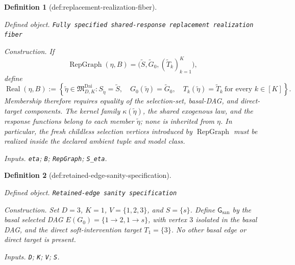 \documentclass{article}
\newtheorem{definition}{Definition}
\begin{document}
\begin{definition}[def:replacement-realization-fiber]\label{def:replacement-realization-fiber}
\par\smallskip\noindent\emph{Defined object.} \texttt{Fully specified shared-\allowbreak{}response replacement realization fiber}
\par\smallskip\noindent\emph{Construction.} If
\[
 \operatorname{RepGraph}(\eta,B)
 =\bigl(\widetilde S,\widetilde G_0,(\widetilde T_k)_{k=1}^{K}\bigr),
\]
define
\[
 \operatorname{Real}(\eta,B)
 :=\left\{\widetilde\eta\in\mathfrak M_{D,K}^{\mathrm{Dai}}:
 S_{\widetilde\eta}=\widetilde S,\quad
 G_0(\widetilde\eta)=\widetilde G_0,\quad
 T_k(\widetilde\eta)=\widetilde T_k\ \text{for every }k\in[K]
 \right\}.
\]
Membership therefore requires equality of the selection-set, basal-DAG, and direct-target components. The kernel family \(\kappa(\widetilde\eta)\), the shared exogenous law, and the response functions belong to each member \(\widetilde\eta\); none is inherited from \(\eta\). In particular, the fresh childless selection vertices introduced by \(\operatorname{RepGraph}\) must be realized inside the declared ambient tuple and model class.
\par\smallskip\noindent\emph{Inputs.} \texttt{eta}; \texttt{B}; \texttt{RepGraph}; \texttt{S\_\allowbreak{}eta}.
\end{definition}

\begin{definition}[def:retained-edge-sanity-specification]\label{def:retained-edge-sanity-specification}
\par\smallskip\noindent\emph{Defined object.} \texttt{Retained-\allowbreak{}edge sanity specification}
\par\smallskip\noindent\emph{Construction.} Set \(D=3\), \(K=1\), \(V=\{1,2,3\}\), and \(S=\{s\}\). Define \(\mathsf G_{\mathrm{san}}\) by the basal selected DAG \(E(G_0)=\{1\to2,1\to s\}\), with vertex \(3\) isolated in the basal DAG, and the direct soft-intervention target \(T_1=\{3\}\). No other basal edge or direct target is present.
\par\smallskip\noindent\emph{Inputs.} \texttt{D}; \texttt{K}; \texttt{V}; \texttt{S}.
\end{definition}
\end{document}
